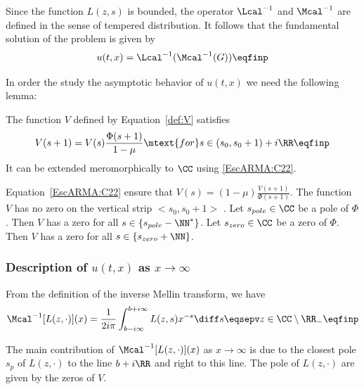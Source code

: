 Since the function $L(z,s)$ is bounded, the operator $\Lcal^{-1}$ and $ \Mcal^{-1}$ are defined in the sense of tempered distribution. It follows that the fundamental solution of the problem is given by 
    \begin{equation}
        u(t,x) = \Lcal^{-1} (\Mcal^{-1} (G))
        \eqfinp
    \end{equation}
    
In order the study the asymptotic behavior of $u(t,x)$ we need the following lemma: 
\begin{lemma}The function $V$ defined by Equation~\eqref{def:V} satisfies
    \begin{equation}
        V(s+1) = V(s)\frac{\Phi(s+1)}{1-\mu}
        \mtext{for}
        s \in (s_0, s_0+1) + i\RR
        \eqfinp
        \label{EscARMA:C22}
    \end{equation}
It can be extended meromorphically to $\CC$ using \eqref{EscARMA:C22}.
\end{lemma}

\begin{remark}
    Equation~\eqref{EscARMA:C22} ensure that $V(s) = (1-\mu)\frac{V(s+1)}{\Phi(s+1)}$. 
    The function $V$ has no zero on the vertical strip $<s_0, s_0+1>$ . Let $s_{pole} \in \CC$ be a pole of $\Phi$. Then $V$ has a zero for all $s \in \{s_{pole} - \NN^* \}$.
    Let $s_{zero} \in \CC$ be a zero of $\Phi$. Then $V$ has a zero for all 
    $s \in \{s_{zero} + \NN\}$. 
\end{remark}

    
\subsubsection{Description of $u(t,x)$ as $x \to \infty$}\text{\\}

From the definition of the inverse Mellin transform, we have
\begin{equation}
    \Mcal^{-1}[L(z,\cdot)](x) = \frac{1}{2i\pi} \int_{b-i\infty}^{b+i\infty} L(z,s)x^{-s}\diff s
    \eqsepv
    z \in \CC \setminus \RR_-
    \eqfinp
\end{equation}

The main contribution of $\Mcal^{-1}[L(z,\cdot)](x)$ as $x \to \infty$ is due to the closest pole $s_p$ of $L(z,\cdot)$ to the line $b+i\RR$ and right to this line. The pole of $L(z,\cdot)$ are given by the zeros of $V$. 

